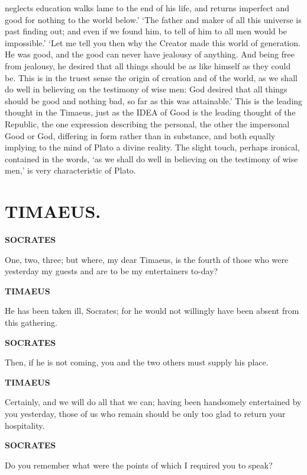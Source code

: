 \documentclass[11pt,letter]{article}
\begin{document}
neglects education walks lame to the end of his life, and returns imperfect and good for nothing to the world below.’ ‘The father and maker of all this universe is past finding out; and even if we found him, to tell of him to all men would be impossible.’ ‘Let me tell you then why the Creator made this world of generation. He was good, and the good can never have jealousy of anything. And being free from jealousy, he desired that all things should be as like himself as they could be. This is in the truest sense the origin of creation and of the world, as we shall do well in believing on the testimony of wise men: God desired that all things should be good and nothing bad, so far as this was attainable.’ This is the leading thought in the Timaeus, just as the IDEA of Good is the leading thought of the Republic, the one expression describing the personal, the other the impersonal Good or God, differing in form rather than in substance, and both equally implying to the mind of Plato a divine reality. The slight touch, perhaps ironical, contained in the words, ‘as we shall do well in believing on the testimony of wise men,’ is very characteristic of Plato.

\par 
\section{
      TIMAEUS.
    } 
\par \textbf{SOCRATES}
\par   One, two, three; but where, my dear Timaeus, is the fourth of those who were yesterday my guests and are to be my entertainers to-day?

\par \textbf{TIMAEUS}
\par   He has been taken ill, Socrates; for he would not willingly have been absent from this gathering.

\par \textbf{SOCRATES}
\par   Then, if he is not coming, you and the two others must supply his place.

\par \textbf{TIMAEUS}
\par   Certainly, and we will do all that we can; having been handsomely entertained by you yesterday, those of us who remain should be only too glad to return your hospitality.

\par \textbf{SOCRATES}
\par   Do you remember what were the points of which I required you to speak?
\end{document}
